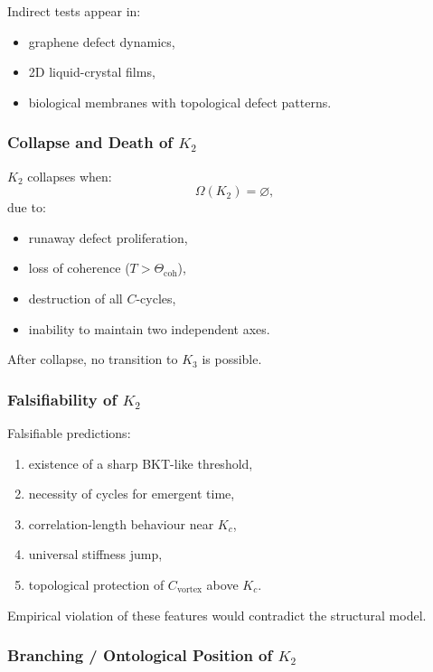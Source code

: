 Indirect tests appear in:
\begin{itemize}
    \item graphene defect dynamics,
    \item 2D liquid-crystal films,
    \item biological membranes with topological defect patterns.
\end{itemize}

\subsubsection{Collapse and Death of \texorpdfstring{$K_2$}{K_2}}

$K_2$ collapses when:
\[
\Omega(K_2) = \varnothing,
\]
due to:
\begin{itemize}
    \item runaway defect proliferation,
    \item loss of coherence ($T > \Theta_{\mathrm{coh}}$),
    \item destruction of all $C$-cycles,
    \item inability to maintain two independent axes.
\end{itemize}

After collapse, no transition to $K_3$ is possible.

\subsubsection{Falsifiability of \texorpdfstring{$K_2$}{K_2}}

Falsifiable predictions:
\begin{enumerate}
    \item existence of a sharp BKT-like threshold,
    \item necessity of cycles for emergent time,
    \item correlation-length behaviour near $K_c$,
    \item universal stiffness jump,
    \item topological protection of $C_{\mathrm{vortex}}$ above $K_c$.
\end{enumerate}

Empirical violation of these features would contradict the structural
model.

\subsubsection{Branching / Ontological Position of \texorpdfstring{$K_2$}{K_2}}

